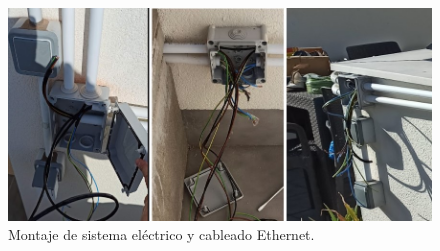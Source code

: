 \begin{figure}[!htb]
\begin{center}
\includegraphics[width=1\textwidth]{./figuras/trabajo_electrico.jpg}
\caption{Montaje de sistema eléctrico y cableado Ethernet.}
\label{F:trabajo_electrico}
\end{center}
\end{figure}

